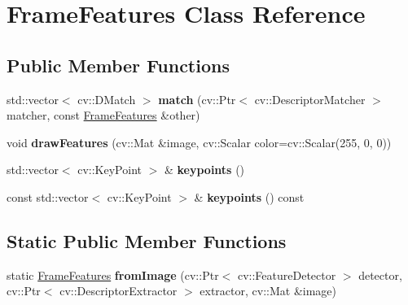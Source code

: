 \hypertarget{class_frame_features}{\section{Frame\-Features Class Reference}
\label{class_frame_features}
}
\subsection*{Public Member Functions}
\begin{DoxyCompactItemize}
\item 
\hypertarget{class_frame_features_a6977a4effbe856ff8583f4352cd138b8}{std\-::vector$<$ cv\-::\-D\-Match $>$ {\bfseries match} (cv\-::\-Ptr$<$ cv\-::\-Descriptor\-Matcher $>$ matcher, const \hyperlink{class_frame_features}{Frame\-Features} \&other)}\label{class_frame_features_a6977a4effbe856ff8583f4352cd138b8}

\item 
\hypertarget{class_frame_features_ae36e05c015c5980fb0801fc0b6ee97ca}{void {\bfseries draw\-Features} (cv\-::\-Mat \&image, cv\-::\-Scalar color=cv\-::\-Scalar(255, 0, 0))}\label{class_frame_features_ae36e05c015c5980fb0801fc0b6ee97ca}

\item 
\hypertarget{class_frame_features_aff3c47e301fde7db68ecac5d852c6edf}{std\-::vector$<$ cv\-::\-Key\-Point $>$ \& {\bfseries keypoints} ()}\label{class_frame_features_aff3c47e301fde7db68ecac5d852c6edf}

\item 
\hypertarget{class_frame_features_a29b51fc67b07fe6e5b9236a092d1e17a}{const std\-::vector$<$ cv\-::\-Key\-Point $>$ \& {\bfseries keypoints} () const }\label{class_frame_features_a29b51fc67b07fe6e5b9236a092d1e17a}

\end{DoxyCompactItemize}
\subsection*{Static Public Member Functions}
\begin{DoxyCompactItemize}
\item 
\hypertarget{class_frame_features_a5942b53a2e105a82e6454cd259157aa0}{static \hyperlink{class_frame_features}{Frame\-Features} {\bfseries from\-Image} (cv\-::\-Ptr$<$ cv\-::\-Feature\-Detector $>$ detector, cv\-::\-Ptr$<$ cv\-::\-Descriptor\-Extractor $>$ extractor, cv\-::\-Mat \&image)}\label{class_frame_features_a5942b53a2e105a82e6454cd259157aa0}

\end{DoxyCompactItemize}


